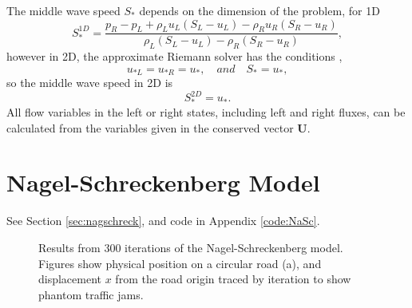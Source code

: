 	The middle wave speed $S_*$ depends on the dimension of the problem, for 1D
	\begin{equation}
		S_*^{1D}=\frac{p_R-p_L+\rho_Lu_L\left(S_L-u_L\right)-\rho_Ru_R\left(S_R-u_R\right)}{\rho_L\left(S_L-u_L\right)-\rho_R\left(S_R-u_R\right)}, \nonumber
	\end{equation}
	however in 2D, the approximate Riemann solver has the conditions \cite{Toro09},
	\begin{equation}
		u_{*L}=u_{*R}=u_*, \quad and \quad S_*=u_*, \nonumber
	\end{equation}
	so the middle wave speed in 2D is
	\begin{equation}
		S_*^{2D}=u_*. \nonumber
	\end{equation}
	All flow variables in the left or right states, including left and right fluxes, can be calculated from the variables given in the conserved vector $\mathbf{U}$.

\section{Nagel-Schreckenberg Model}
\label{ap:nagsch}

	See Section \ref{sec:nagschreck}, and code in Appendix \ref{code:NaSc}.

	\begin{figure}[H]
  		\centering
  		\hfill
  		\caption[Nagel-Schreckenberg simulation]{Results from 300 iterations of the Nagel-Schreckenberg \cite{Nagel92} model. Figures show physical position on a circular road (a), and displacement $x$ from the road origin traced by iteration to show phantom traffic jams. \label{fig:aupp:NaSc}}
	\end{figure}

